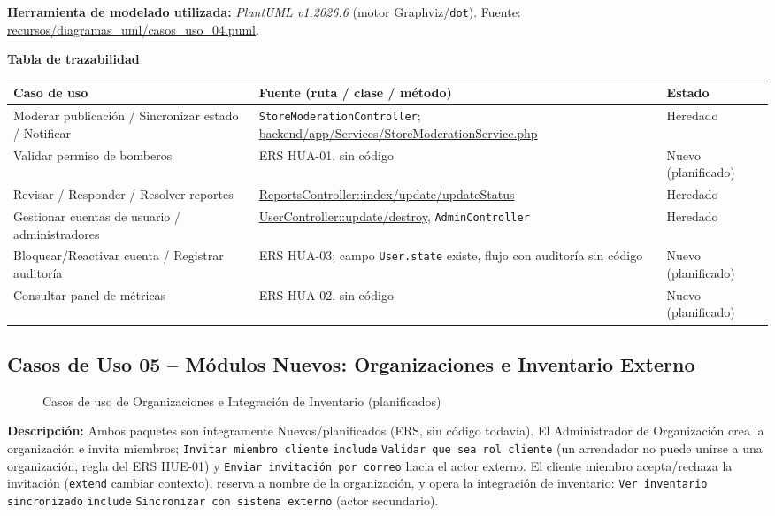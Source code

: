 \bigskip
{\sloppy\noindent\textbf{Herramienta de modelado utilizada:} \textit{PlantUML v1.2026.6} (motor Graphviz/\texttt{dot}). Fuente: \url{recursos/diagramas_uml/casos_uso_04.puml}.\par}

\bigskip
\noindent\textbf{Tabla de trazabilidad}
\begin{longtable}{|L{5cm}|L{7.5cm}|M{2cm}|}
\hline
{} \textbf{Caso de uso} & \textbf{Fuente (ruta / clase / método)} & \textbf{Estado} \\ \hline
\endhead
Moderar publicación / Sincronizar estado / Notificar & \texttt{StoreModerationController}; \url{backend/app/Services/StoreModerationService.php} & Heredado \\ \hline
Validar permiso de bomberos & ERS HUA-01, sin código & Nuevo (planificado) \\ \hline
Revisar / Responder / Resolver reportes & \url{ReportsController::index/update/updateStatus} & Heredado \\ \hline
Gestionar cuentas de usuario / administradores & \url{UserController::update/destroy}, \texttt{AdminController} & Heredado \\ \hline
Bloquear/Reactivar cuenta / Registrar auditoría & ERS HUA-03; campo \texttt{User.state} existe, flujo con auditoría sin código & Nuevo (planificado) \\ \hline
Consultar panel de métricas & ERS HUA-02, sin código & Nuevo (planificado) \\ \hline
\end{longtable}
\clearpage

\subsection{Casos de Uso 05 -- Módulos Nuevos: Organizaciones e Inventario Externo}
\begin{figure}[H]
    \centering
    \caption{Casos de uso de Organizaciones e Integración de Inventario (planificados)}
    \label{fig:cu05}
\end{figure}
\noindent\textbf{Descripción:} Ambos paquetes son íntegramente Nuevos/planificados (ERS, sin código todavía). El Administrador de Organización crea la organización e invita miembros; \texttt{Invitar miembro cliente} \texttt{\guillemotleft include\guillemotright} \texttt{Validar que sea rol cliente} (un arrendador no puede unirse a una organización, regla del ERS HUE-01) y \texttt{Enviar invitación por correo} hacia el actor externo. El cliente miembro acepta/rechaza la invitación (\texttt{\guillemotleft extend\guillemotright} cambiar contexto), reserva a nombre de la organización, y opera la integración de inventario: \texttt{Ver inventario sincronizado} \texttt{\guillemotleft include\guillemotright} \texttt{Sincronizar con sistema externo} (actor secundario).


